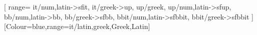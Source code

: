 \RequirePackage{amsmath,amsthm,mathtools}

\DeclareMathOperator{\sen}{sen}
\DeclareMathOperator{\tg}{tg}
\DeclareMathOperator{\cotg}{cotg}
\DeclareMathOperator{\cosec}{cosec}
\DeclareMathOperator{\arcsen}{arcsen}
\DeclareMathOperator{\arctg}{arctg}
\DeclareMathOperator{\senh}{senh}
\DeclareMathOperator{\tgh}{tgh}
\DeclareMathOperator{\mdc}{mdc}
\DeclareMathOperator{\mmc}{mmc}
\DeclareMathOperator{\med}{med}
\DeclareMathOperator{\rad}{rad}
\DeclareMathOperator{\dirac}{\delta}
\DeclareMathOperator{\mmu}{\mu}
\DeclareMathOperator{\D}{D}
\DeclareMathOperator{\CD}{CD}
\DeclareMathOperator{\area}{\text{Área}\,}

\newcommand{\R}{\mathbb{R}}
\newcommand{\Q}{\mathbb{Q}}
\newcommand{\Z}{\mathbb{Z}}
\newcommand{\N}{\mathbb{N}}
\renewcommand{\Im}{\operatorname{Im}}
\renewcommand{\Re}{\operatorname{Re}}


\iffonts
  \RequirePackage{unicode-math}

  [
      range={
          it/{num,latin}->sfit,
          it/{greek}->up,
          up/{greek},
          up/{num,latin}->sfup,
          bb/{num,latin}->bb,
          bb/{greek}->sfbb,
          bbit/{num,latin}->sfbbit,
          bbit/{greek}->sfbbit
      }
  ]
  [Colour=blue,range=it/{latin,greek,Greek,Latin}]
\else
  \RequirePackage{amssymb}
\fi
